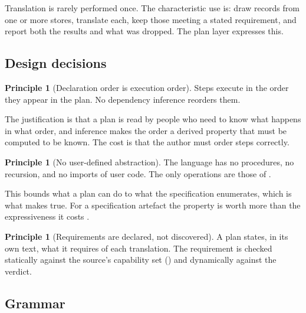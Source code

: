 \documentclass[11pt,twocolumn,a4paper]{article}
\theoremstyle{msthm}
\theoremstyle{definition}
\newtheorem{principle}[theorem]{Principle}
\theoremstyle{remark}
\begin{document}
Translation is rarely performed once. The characteristic use is: draw
records from one or more stores, translate each, keep those meeting a
stated requirement, and report both the results and what was dropped.
The plan layer expresses this.

\subsection{Design decisions}

\begin{principle}[Declaration order is execution order]
\label{prin:order}
Steps execute in the order they appear in the plan. No dependency
inference reorders them.
\end{principle}

The justification is that a plan is read by people who need to know what
happens in what order, and inference makes the order a derived property
that must be computed to be known. The cost is that the author must
order steps correctly.

\begin{principle}[No user-defined abstraction]
\label{prin:noabs}
The language has no procedures, no recursion, and no imports of user
code. The only operations are those of .
\end{principle}

This bounds what a plan can do to what the specification enumerates,
which is what makes  true. For a specification
artefact the property is worth more than the expressiveness it costs
\citep{mernik2005when,vandeursen2000domain}.

\begin{principle}[Requirements are declared, not discovered]
\label{prin:req}
A plan states, in its own text, what it requires of each translation.
The requirement is checked statically against the source's capability
set () and dynamically against the verdict.
\end{principle}

\subsection{Grammar}
\end{document}
